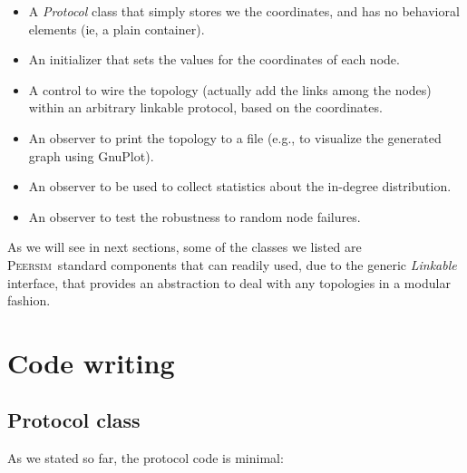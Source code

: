 \documentclass[a4paper,11pt]{article}
\newcommand{\id}[1]{{\scshape\small #1}}
\newcommand{\psim}{\id{Peersim}}
\begin{document}
\begin{itemize}

\item A \emph{Protocol} class that simply stores we the coordinates,
and has no behavioral elements (ie, a plain container).
 
\item An initializer that sets the values for the coordinates of each node.

\item A control to wire the topology (actually add the links among the
nodes) within an arbitrary linkable protocol, based on the coordinates.

\item An observer to print the topology to a file (e.g., to
  visualize the generated graph using GnuPlot).

\item An observer to be used to collect statistics about the
  in-degree distribution.

\item An observer to test the robustness to random node
  failures.


\end{itemize}

As we will see in next sections, some of the classes we listed are
\psim\ standard components that can readily used, due to the generic
\emph{Linkable} interface, that provides an abstraction to deal with any
topologies in a modular fashion.


\section{Code writing}

\subsection{Protocol class}

As we stated so far, the protocol code is minimal:
\end{document}

